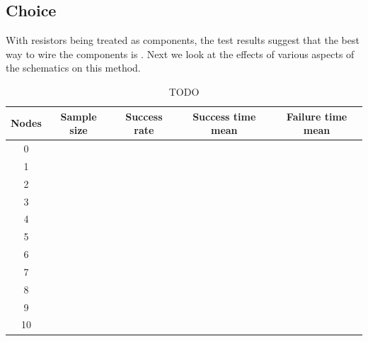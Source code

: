 \subsection{Choice}

With resistors being treated as components, the test results suggest that the
best way to wire the components is \q. Next we look at the effects of various
aspects of the schematics on this method.

\begin{table}[H]
\begin{center}
\begin{singlespace}
\begin{tabular}{| c | c | c | c | c |}
\hline
Nodes & Sample size & Success rate & Success time mean & Failure time mean\\
\hline\hline
0 & & & & \\
1 & & & & \\
2 & & & & \\
3 & & & & \\
4 & & & & \\
5 & & & & \\
6 & & & & \\
7 & & & & \\
8 & & & & \\
9 & & & & \\
10 & & & & \\
\hline
\end{tabular}
\end{singlespace}
\end{center}
\label{tb:TODO}
\caption{TODO}
\end{table}

